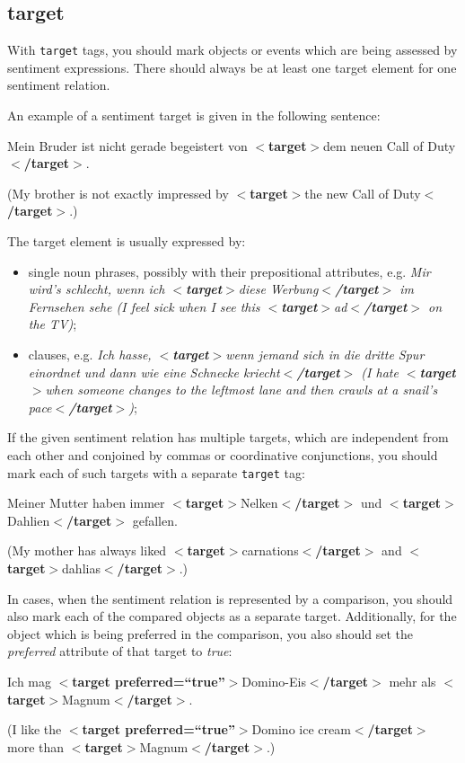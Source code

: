 \documentclass[11pt,a4paper]{article}
\newcommand{\xmltag}[1]{{\textbf{\small$<$#1$>$}}}
\newcommand{\target}[1]{\xmltag{target}#1\xmltag{/target}}
\newenvironment{myexe}{
  \begin{exe}
    \ex\begin{center}
    \itshape
}{
    \end{center}
  \end{exe}
}
\begin{document}
\subsection{target}
With \texttt{target} tags, you should mark objects or events which are being
assessed by sentiment expressions.  There should always be at least one target
element for one sentiment relation.

An example of a sentiment target is given in the following sentence:
\begin{myexe}
Mein Bruder ist nicht gerade begeistert von \target{dem neuen Call of
  Duty}.

(My brother is not exactly impressed by \target{the new Call of
  Duty}.)
\end{myexe}

The target element is usually expressed by:
\begin{itemize}
\item single noun phrases, possibly with their prepositional attributes,
  e.g. \textit{Mir wird's schlecht, wenn ich \target{diese Werbung} im
    Fernsehen sehe (I feel sick when I see this \target{ad} on the TV)};

\item clauses, e.g. \textit{Ich hasse, \target{wenn jemand sich in die dritte
    Spur einordnet und dann wie eine Schnecke kriecht} (I hate \target{when
    someone changes to the leftmost lane and then crawls at a snail's pace})};
\end{itemize}

If the given sentiment relation has multiple targets, which are independent
from each other and conjoined by commas or coordinative conjunctions, you
should mark each of such targets with a separate \texttt{target} tag:
\begin{myexe}
  Meiner Mutter haben immer \target{Nelken} und \target{Dahlien}
  gefallen.

  (My mother has always liked \target{carnations} and
  \target{dahlias}.)
\end{myexe}

In cases, when the sentiment relation is represented by a comparison,
you should also mark each of the compared objects as a separate
target.  Additionally, for the object which is being preferred in the
comparison, you also should set the \textit{preferred} attribute of
that target to \textit{true}:
\begin{myexe}
  Ich mag $<$\textbf{target
    preferred=``true''}$>$Domino-Eis$<$\textbf{/target}$>$ mehr als
  \target{Magnum}.

  (I like the $<$\textbf{target preferred=``true''}$>$Domino ice
  cream$<$\textbf{/target}$>$ more than \target{Magnum}.)
\end{myexe}
\end{document}
